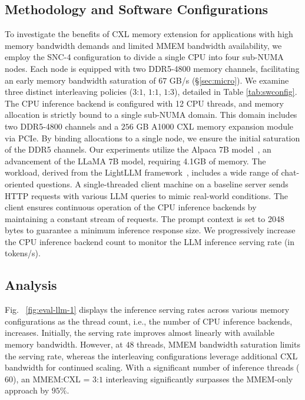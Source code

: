 \subsection{Methodology and Software Configurations}
To investigate the benefits of CXL memory extension for applications with high memory bandwidth demands and limited MMEM bandwidth availability, we employ the SNC-4 configuration to divide a single CPU into four sub-NUMA nodes. Each node is equipped with two DDR5-4800 memory channels, facilitating an early memory bandwidth saturation of $67$ GB/s (\S\ref{sec:micro}). We examine three distinct interleaving policies ($3$:$1$, $1$:$1$, $1$:$3$), detailed in Table \ref{tab:swconfig}. The CPU inference backend is configured with 12 CPU threads, and memory allocation is strictly bound to a single sub-NUMA domain. This domain includes two DDR5-4800 channels and a $256$ GB A1000 CXL memory expansion module via PCIe. By binding allocations to a single node, we ensure the initial saturation of the DDR5 channels. Our experiments utilize the Alpaca 7B model~\cite{alpaca}, an advancement of the LLaMA 7B model, requiring 4.1GB of memory. The workload, derived from the LightLLM framework~\cite{lightllm}, includes a wide range of chat-oriented questions. A single-threaded client machine on a baseline server sends HTTP requests with various LLM queries to mimic real-world conditions. The client ensures continuous operation of the CPU inference backends by maintaining a constant stream of requests. The prompt context is set to 2048 bytes to guarantee a minimum inference response size. We progressively increase the CPU inference backend count to monitor the LLM inference serving rate (in tokens/s).

\subsection{Analysis}
Fig. ~\ref{fig:eval-llm-1} displays the inference serving rates across various memory configurations as the thread count, i.e., the number of CPU inference backends, increases. Initially, the serving rate improves almost linearly with available memory bandwidth. However, at $48$ threads, MMEM bandwidth saturation limits the serving rate, whereas the interleaving configurations leverage additional CXL bandwidth for continued scaling. With a significant number of inference threads ($60$), an MMEM:CXL = $3$:$1$ interleaving significantly surpasses the MMEM-only approach by $95\%$.

